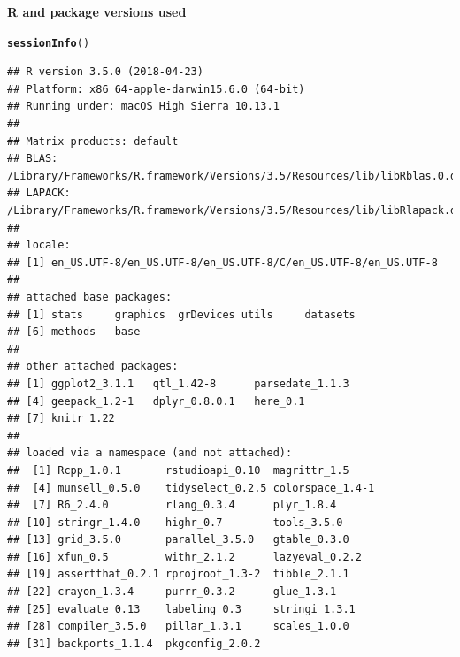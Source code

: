\documentclass[12pt]{article}\usepackage[]{graphicx}\usepackage[]{color}
\makeatletter
\newcommand{\hlstd}[1]{\textcolor[rgb]{0.345,0.345,0.345}{#1}}%
\newcommand{\hlkwd}[1]{\textcolor[rgb]{0.737,0.353,0.396}{\textbf{#1}}}%
\newenvironment{kframe}{%
 \def\at@end@of@kframe{}%
 \ifinner\ifhmode%
  \def\at@end@of@kframe{\end{minipage}}%
  \begin{minipage}{\columnwidth}%
 \fi\fi%
 \def\FrameCommand##1{\hskip\@totalleftmargin \hskip-\fboxsep
 \colorbox{shadecolor}{##1}\hskip-\fboxsep
     \hskip-\linewidth \hskip-\@totalleftmargin \hskip\columnwidth}%
 \MakeFramed {\advance\hsize-\width
   \@totalleftmargin\z@ \linewidth\hsize
   \@setminipage}}%
 {\par\unskip\endMakeFramed%
 \at@end@of@kframe}
\newenvironment{knitrout}{}{} %
\makeatother
\begin{document}
\bigskip
{\sffamily \textbf{R and package versions used}}
\nopagebreak




\begin{knitrout}
\color{fgcolor}\begin{kframe}
\begin{alltt}
\hlkwd{sessionInfo}\hlstd{()}
\end{alltt}
\begin{verbatim}
## R version 3.5.0 (2018-04-23)
## Platform: x86_64-apple-darwin15.6.0 (64-bit)
## Running under: macOS High Sierra 10.13.1
## 
## Matrix products: default
## BLAS: /Library/Frameworks/R.framework/Versions/3.5/Resources/lib/libRblas.0.dylib
## LAPACK: /Library/Frameworks/R.framework/Versions/3.5/Resources/lib/libRlapack.dylib
## 
## locale:
## [1] en_US.UTF-8/en_US.UTF-8/en_US.UTF-8/C/en_US.UTF-8/en_US.UTF-8
## 
## attached base packages:
## [1] stats     graphics  grDevices utils     datasets 
## [6] methods   base     
## 
## other attached packages:
## [1] ggplot2_3.1.1   qtl_1.42-8      parsedate_1.1.3
## [4] geepack_1.2-1   dplyr_0.8.0.1   here_0.1       
## [7] knitr_1.22     
## 
## loaded via a namespace (and not attached):
##  [1] Rcpp_1.0.1       rstudioapi_0.10  magrittr_1.5    
##  [4] munsell_0.5.0    tidyselect_0.2.5 colorspace_1.4-1
##  [7] R6_2.4.0         rlang_0.3.4      plyr_1.8.4      
## [10] stringr_1.4.0    highr_0.7        tools_3.5.0     
## [13] grid_3.5.0       parallel_3.5.0   gtable_0.3.0    
## [16] xfun_0.5         withr_2.1.2      lazyeval_0.2.2  
## [19] assertthat_0.2.1 rprojroot_1.3-2  tibble_2.1.1    
## [22] crayon_1.3.4     purrr_0.3.2      glue_1.3.1      
## [25] evaluate_0.13    labeling_0.3     stringi_1.3.1   
## [28] compiler_3.5.0   pillar_1.3.1     scales_1.0.0    
## [31] backports_1.1.4  pkgconfig_2.0.2
\end{verbatim}
\end{kframe}
\end{knitrout}

%  
% 
\end{document}
